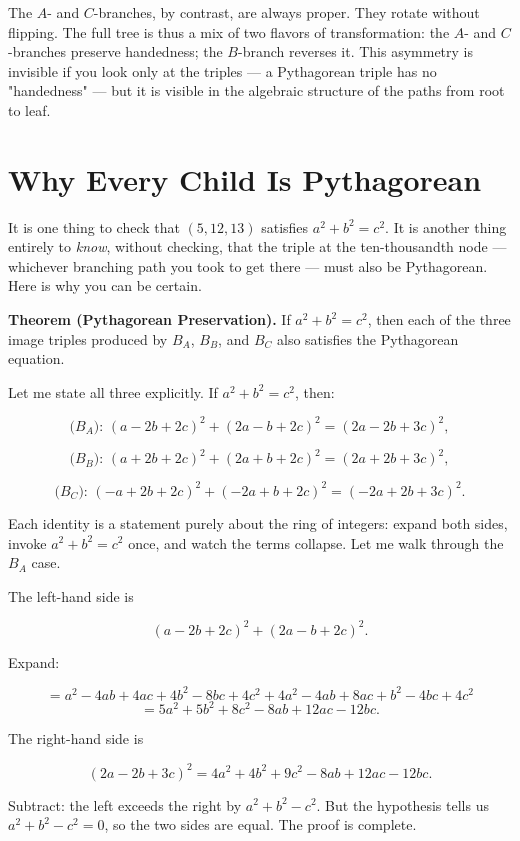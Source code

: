 \documentclass[11pt,openright,twoside]{book}
\theoremstyle{definition}
\begin{document}
The $A$- and $C$-branches, by contrast, are always proper. They rotate without flipping. The full tree is thus a mix of two flavors of transformation: the $A$- and $C$-branches preserve handedness; the $B$-branch reverses it. This asymmetry is invisible if you look only at the triples --- a Pythagorean triple has no "handedness" --- but it is visible in the algebraic structure of the paths from root to leaf.


\bigskip


\section{Why Every Child Is Pythagorean}

It is one thing to check that $(5, 12, 13)$ satisfies $a^2 + b^2 = c^2$. It is another thing entirely to \textit{know}, without checking, that the triple at the ten-thousandth node --- whichever branching path you took to get there --- must also be Pythagorean. Here is why you can be certain.

\textbf{Theorem (Pythagorean Preservation).} If $a^2 + b^2 = c^2$, then each of the three image triples produced by $B_A$, $B_B$, and $B_C$ also satisfies the Pythagorean equation.

Let me state all three explicitly. If $a^2 + b^2 = c^2$, then:

\[\text{($B_A$): } (a - 2b + 2c)^2 + (2a - b + 2c)^2 = (2a - 2b + 3c)^2,\]

\[\text{($B_B$): } (a + 2b + 2c)^2 + (2a + b + 2c)^2 = (2a + 2b + 3c)^2,\]

\[\text{($B_C$): } (-a + 2b + 2c)^2 + (-2a + b + 2c)^2 = (-2a + 2b + 3c)^2.\]

Each identity is a statement purely about the ring of integers: expand both sides, invoke $a^2 + b^2 = c^2$ once, and watch the terms collapse. Let me walk through the $B_A$ case.

The left-hand side is

\[(a - 2b + 2c)^2 + (2a - b + 2c)^2.\]

Expand:

\[= a^2 - 4ab + 4ac + 4b^2 - 8bc + 4c^2 + 4a^2 - 4ab + 8ac + b^2 - 4bc + 4c^2\]
\[= 5a^2 + 5b^2 + 8c^2 - 8ab + 12ac - 12bc.\]

The right-hand side is

\[(2a - 2b + 3c)^2 = 4a^2 + 4b^2 + 9c^2 - 8ab + 12ac - 12bc.\]

Subtract: the left exceeds the right by $a^2 + b^2 - c^2$. But the hypothesis tells us $a^2 + b^2 - c^2 = 0$, so the two sides are equal. The proof is complete.
\end{document}
